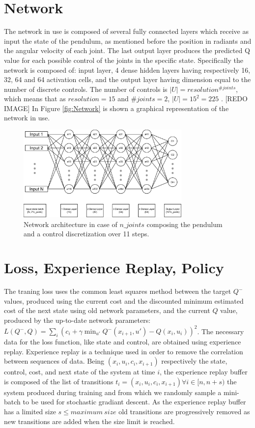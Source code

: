 \documentclass[twocolumn, a4paper]{article}
\begin{document}
\section{Network}
The network in use is composed of several fully connected layers which receive
as input the state of the pendulum, as mentioned before the position in
radiants and the angular velocity of each joint.
The last output layer produces the predicted Q value for each possible control
of the joints in the specific state.
Specifically the network is composed of: input layer, 4 dense hidden layers
having respectively 16, 32, 64 and 64 activation cells, and the output layer
having dimension equal to the number of discrete controls.
The number of controls is \(|U|=resolution^{\#joints}\), which
means that as \(resolution=15\) and \(\#joints=2\), \(|U|=15^{2}=225\) .
[REDO IMAGE]
In Figure \ref{fig:Network} is shown a graphical representation of the network
in use.

\label{fig:Network}
\begin{figure}
	\centering
	\includegraphics[width=8.5cm]{"../Figures/Network_schema"}
	\caption{Network architecture in case of $n\_joints$ composing the pendulum
			 and a control discretization over 11 steps.}
\end{figure}

\section{Loss, Experience Replay, Policy}
The traning loss uses the common least squares method between the target \(Q^{-}\) values, produced using the current cost and the discounted minimum estimated cost of the next state using old network parameters, and the current \(Q\) value, produced by the up-to-date network parameters: \(L(Q^{-},Q)=\sum_{i}(c_{i}+\gamma\min_{u'}Q^{-}(x_{i+1},u')-Q(x_{i},u_{i}))^{2}\).
The necessary data for the loss function, like state and control, are obtained using experience replay.
Experience replay is a technique used in order to remove the correlation between sequences of data.
Being \((x_{i}, u_{i}, c_{i}, x_{i+1})\) respectively the state, control, cost, and next state of the system at time \(i\), the experience replay buffer is composed of the list of transitions \({t_{i}=(x_{i}, u_{i}, c_{i}, x_{i+1}) \forall i\in [n, n+s)}\) the system produced during training and from which we randomly sample a mini-batch to be used for stochastic gradiant descent.
As the experience replay buffer has a limited size \(s\leq maximum\:size\) old transitions are progressively removed as new transitions are added when the size limit is reached.
\end{document}

